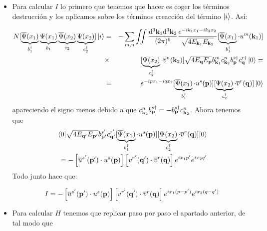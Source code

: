 \begin{solucion}
	\begin{itemize}
		\item Para calcular $I$ lo primero que tenemos que hacer es coger los términos destrucción y los aplicamos sobre los términos creacción del término $\ket{i}$. Así:
		
		\begin{eqnarray*}
			N[ \underbrace{ \overline{\Psi} (x_1)}_{b^\dagger_1}\underbrace{ \Psi (x_1)}_{b_1} \underbrace{ \overline{\Psi} 	(x_2)}_{c_2} \underbrace{ \Psi (x_2)}_{c^\dagger_2} ] \ket{i} & = & -\sum_{m,n} \iint \frac{\mathrm{d}^3 \mathbf{k}_1 \mathrm{d}^3 \mathbf{k}_2}{(2\pi)^6} \frac{e^{-i k_1 x_1 - i k_2 x_2}}{\sqrt{4E_{\mathbf{k}_1}E_{\mathbf{k}_2}}} [\underbrace{ \overline{\Psi} (x_1)}_{b^\dagger_1} \cdot u^m(\mathbf{k}_1)]  \\ & \times & [\underbrace{ \Psi (x_2)}_{c^\dagger_2} \cdot \overline{v}^n(\mathbf{k}_2)] \sqrt{4E_{\mathbf{q}} E_{\mathbf{p}}} b_{\mathbf{k}_1}^m c_{\mathbf{k}_2}^n b_{\mathbf{p}}^{s\dagger} c_ {\mathbf{q}}^{r \dagger}  \ket{0} =  \\
			& = &  e^{-i p x_1 - i q x_2} [\underbrace{ \overline{\Psi} (x_1)}_{b^\dagger_1} \cdot u^s(\mathbf{p})]  [\underbrace{ \Psi (x_2)}_{c^\dagger_2} \cdot \overline{v}^r(\mathbf{q})]  \ket{0}  
		\end{eqnarray*}
		apareciendo el signo menos debido a que $c_{\mathbf{k}_2}^n b_{\mathbf{p}}^{s\dagger}=- b_{\mathbf{p}}^{s\dagger}c_{\mathbf{k}_2}^n$. Ahora tenemos que 
		\begin{eqnarray*}
			\mel{0}{ \sqrt{4E_{\mathbf{q}'} E_{\mathbf{p}'}} b_{\mathbf{p}'}^{s'} c_{\mathbf{q}'}^{r'} [\underbrace{ \overline{\Psi}(x_1)}_{b^\dagger_1} \cdot u^s(\mathbf{p})] [\underbrace{ \Psi (x_2)}_{c^\dagger_2} \cdot \overline{v}^r(\mathbf{q})] }{0} \\ =- \left[ \overline{u}^{s'}(\mathbf{p}') \cdot u^{s}(\mathbf{p}) \right] \left[ v^{r'}(\mathbf{q}') \cdot \overline{v}^{r}(\mathbf{q}) \right] e^{ix_1  p'} e^{ix_2 q'}
		\end{eqnarray*}
		Todo junto hace que:
		
		\begin{equation*}
			I = - \left[ \overline{u}^{s'}(\mathbf{p}') \cdot u^{s}(\mathbf{p}) \right] \left[ v^{r'}(\mathbf{q}') \cdot \overline{v}^{r}(\mathbf{q}) \right]e^{ix_1(p-p')}e^{ix_2(q-q')}
		\end{equation*}
		
		\item Para calcular $H$ tenemos que replicar paso por paso el apartado anterior, de tal modo que 
		

\end{itemize}
\end{solucion}
